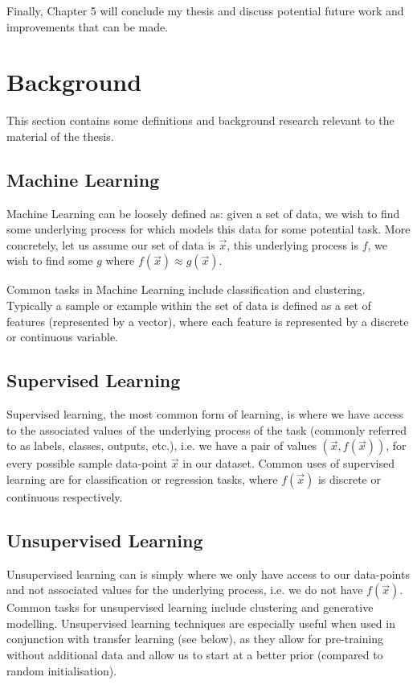 \documentclass{report}
\newcommand\blankpage{%
    \null
    \thispagestyle{empty}%
    \addtocounter{page}{-1}%
    \newpage}
\theoremstyle{plain}
\theoremstyle{definition}
\theoremstyle{remark}
\numberwithin{equation}{section}
\numberwithin{figure}{section}
\newcommand{\<}{\langle}
\renewcommand{\>}{\rangle}
\begin{document}
\noindent
Finally, Chapter 5 will conclude my thesis and discuss potential future work and improvements that can be made.

\newpage

\blankpage
\chapter{Background}

This section contains some definitions and background research relevant to the material of the thesis.

\section{Machine Learning}
Machine Learning can be loosely defined as: given a set of data, we wish to find some underlying process for which models this data for some potential task. More concretely, let us assume our set of data is $\vec{x}$, this underlying process is $f$, we wish to find some $g$ where $f(\vec{x}) \approx g(\vec{x})$.

Common tasks in Machine Learning include classification and clustering. Typically a sample or example within the set of data is defined as a set of features (represented by a vector), where each feature is represented by a discrete or continuous variable.

\section{Supervised Learning}
Supervised learning, the most common form of learning, is where we have access to the associated values of the underlying process of the task (commonly referred to as labels, classes, outputs, etc.), i.e. we have a pair of values $(\vec{x}, f(\vec{x}))$, for every possible sample data-point $\vec{x}$ in our dataset. Common uses of supervised learning are for classification or regression tasks, where $f(\vec{x})$ is discrete or continuous respectively.

\section{Unsupervised Learning}
Unsupervised learning can is simply where we only have access to our data-points and not associated values for the underlying process, i.e. we do not have $f(\vec{x})$. Common tasks for unsupervised learning include clustering and generative modelling. Unsupervised learning techniques are especially useful when used in conjunction with transfer learning (see below), as they allow for pre-training without additional data and allow us to start at a better prior (compared to random initialisation). 
\end{document}
